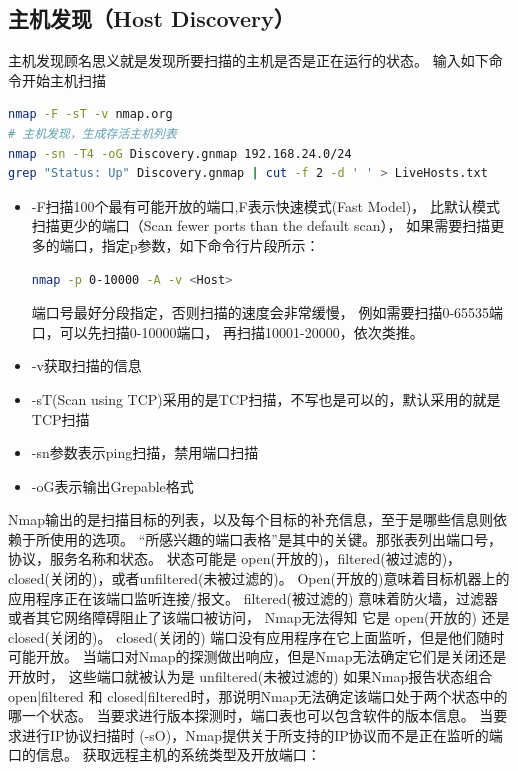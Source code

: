 \documentclass{book}
\begin{document}
\subsection{主机发现（Host Discovery）}

主机发现顾名思义就是发现所要扫描的主机是否是正在运行的状态。
输入如下命令开始主机扫描

\begin{lstlisting}[language=Bash]
nmap -F -sT -v nmap.org
# 主机发现，生成存活主机列表
nmap -sn -T4 -oG Discovery.gnmap 192.168.24.0/24
grep "Status: Up" Discovery.gnmap | cut -f 2 -d ' ' > LiveHosts.txt
\end{lstlisting}

\begin{itemize}
\item{-F}扫描100个最有可能开放的端口,F表示快速模式(Fast Model)，
比默认模式扫描更少的端口（Scan fewer ports than the default scan），
如果需要扫描更多的端口，指定p参数，如下命令行片段所示：

\begin{lstlisting}[language=Bash]
nmap -p 0-10000 -A -v <Host>
\end{lstlisting}

端口号最好分段指定，否则扫描的速度会非常缓慢，
例如需要扫描0-65535端口，可以先扫描0-10000端口，
再扫描10001-20000，依次类推。

\item{-v}获取扫描的信息
\item{-sT(Scan using TCP)}采用的是TCP扫描，不写也是可以的，默认采用的就是TCP扫描
\item{-sn参数表示ping扫描，禁用端口扫描}
\item{-oG表示输出Grepable格式}
\end{itemize}

Nmap输出的是扫描目标的列表，以及每个目标的补充信息，至于是哪些信息则依赖于所使用的选项。
“所感兴趣的端口表格”是其中的关键。那张表列出端口号，协议，服务名称和状态。
状态可能是 open(开放的)，filtered(被过滤的)， closed(关闭的)，或者unfiltered(未被过滤的)。
Open(开放的)意味着目标机器上的应用程序正在该端口监听连接/报文。 
filtered(被过滤的) 意味着防火墙，过滤器或者其它网络障碍阻止了该端口被访问，
Nmap无法得知 它是 open(开放的) 还是 closed(关闭的)。 
closed(关闭的) 端口没有应用程序在它上面监听，但是他们随时可能开放。 
当端口对Nmap的探测做出响应，但是Nmap无法确定它们是关闭还是开放时，
这些端口就被认为是 unfiltered(未被过滤的) 如果Nmap报告状态组合 
open|filtered 和 closed|filtered时，那说明Nmap无法确定该端口处于两个状态中的哪一个状态。
当要求进行版本探测时，端口表也可以包含软件的版本信息。
当要求进行IP协议扫描时 (-sO)，Nmap提供关于所支持的IP协议而不是正在监听的端口的信息。
获取远程主机的系统类型及开放端口：
\end{document}

